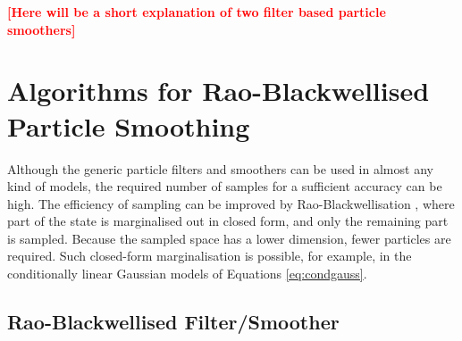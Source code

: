 \documentclass[twocolumn]{autart}    %
\newcommand{\comment}[1]{\textcolor{red}{\textbf{[#1]}}}
\begin{document}
\comment{Here will be a short explanation of two filter based particle
  smoothers}


\section{Algorithms for Rao-Blackwellised Particle Smoothing}

Although the generic particle filters and smoothers can be used in almost any kind of models, the required number of samples for a sufficient accuracy can be high. The efficiency of sampling can be improved by Rao-Blackwellisation \cite{Doucet+Godsill+Andrieu:2000,Chen+Liu:2000}, where part of the state is marginalised out in closed form, and only the remaining part is sampled. Because the sampled space has a lower dimension, fewer particles are required. Such closed-form marginalisation is possible, for example, in the conditionally linear Gaussian models of Equations \eqref{eq:condgauss}.

\subsection{Rao-Blackwellised Filter/Smoother}
\end{document}
